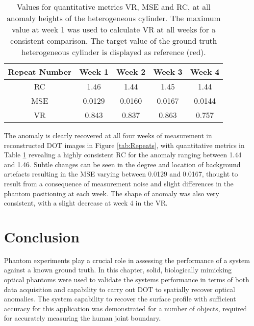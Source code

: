 \documentclass[twoside]{bhamthesis}
\theoremstyle{definition}
\begin{document}
\bgroup
\def\arraystretch{1.2}
\begin{table}[!ht]
\small
\begin{center}
 \begin{tabular}{c c c c c} 
 \hline
 Repeat Number & Week 1 & Week 2 & Week 3 & Week 4 \\  
 \hline
 RC & 1.46 & 1.44 & 1.45  & 1.44  \\
 MSE  & 0.0129   & 0.0160 & 0.0167  & 0.0144\\
 VR &  0.843 & 0.837 & 0.863 &  0.757 \\
 \hline
\end{tabular}
\caption{Values for quantitative metrics VR, MSE and RC, at all anomaly heights of the heterogeneous cylinder. The maximum value at week 1 was used to calculate VR at all weeks for a consistent comparison. The target value of the ground truth heterogeneous cylinder is displayed as reference (red).}
\label{tab:Quant Repeats}
\end{center}
\end{table}
\egroup

The anomaly is clearly recovered at all four weeks of measurement in reconstructed DOT images in Figure \ref{tab:Repeats}, with quantitative metrics in Table 
\ref{tab:Quant Repeats} revealing a highly consistent RC for the anomaly ranging between 1.44 and 1.46. Subtle changes can be seen in the degree and location of background artefacts resulting in the MSE varying between 0.0129 and 0.0167, thought to result from a consequence of measurement noise and slight differences in the phantom positioning at each week. The shape of anomaly was also very consistent, with a slight decrease at week 4 in the VR.

\section{Conclusion}

Phantom experiments play a crucial role in assessing the performance of a system against a known ground truth. In this chapter, solid, biologically mimicking optical phantoms were used to validate the systems performance in terms of both data acquisition and capability to carry out DOT to spatially recover optical anomalies. The system capability to recover the surface profile with sufficient accuracy for this application was demonstrated for a number of objects, required for accurately measuring the human joint boundary. 
\end{document}
